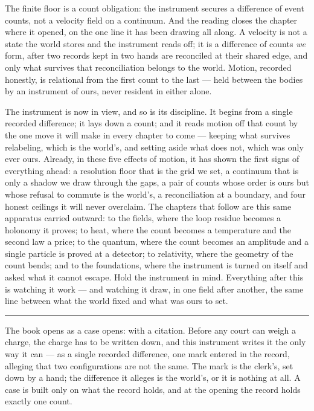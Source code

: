The finite floor is a count obligation: the instrument secures a difference of event counts, not a velocity
field on a continuum. And the reading closes the chapter where it opened, on the one line it has been drawing
all along. A velocity is not a state the world stores and the instrument reads off; it is a difference of
counts \emph{we} form, after two records kept in two hands are reconciled at their shared edge, and only what
survives that reconciliation belongs to the world. Motion, recorded honestly, is relational from the first
count to the last --- held between the bodies by an instrument of ours, never resident in either alone.

\bigskip

The instrument is now in view, and so is its discipline. It begins from a single recorded difference; it lays
down a count; and it reads motion off that count by the one move it will make in every chapter to come ---
keeping what survives relabeling, which is the world's, and setting aside what does not, which was only ever
ours. Already, in these five effects of motion, it has shown the first signs of everything ahead: a resolution
floor that is the grid we set, a continuum that is only a shadow we draw through the gaps, a pair of counts
whose order is ours but whose refusal to commute is the world's, a reconciliation at a boundary, and four
honest ceilings it will never overclaim. The chapters that follow are this same apparatus carried outward: to
the fields, where the loop residue becomes a holonomy it proves; to heat, where the count becomes a
temperature and the second law a price; to the quantum, where the count becomes an amplitude and a single
particle is proved at a detector; to relativity, where the geometry of the count bends; and to the
foundations, where the instrument is turned on itself and asked what it cannot escape. Hold the instrument in
mind. Everything after this is watching it work --- and watching it draw, in one field after another, the same
line between what the world fixed and what was ours to set.

\bigskip
\begin{center}
\rule{0.4\textwidth}{0.4pt}
\end{center}
\bigskip

\noindent The book opens as a case opens: with a citation. Before any court can weigh a charge, the charge
has to be written down, and this instrument writes it the only way it can --- as a single recorded difference,
one mark entered in the record, alleging that two configurations are not the same. The mark is the clerk's, set
down by a hand; the difference it alleges is the world's, or it is nothing at all. A case is built only on what
the record holds, and at the opening the record holds exactly one count.

